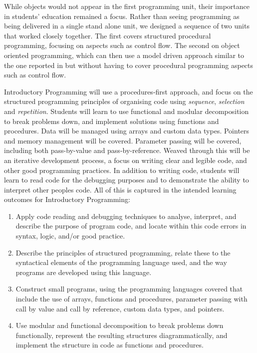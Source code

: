 While objects would not appear in the first programming unit, their importance in students' education remained a focus. Rather than seeing programming as being delivered in a single stand alone unit, we designed a sequence of two units that worked closely together. The first covers structured procedural programming, focusing on aspects such as control flow. The second on object oriented programming, which can then use a model driven approach similar to the one reported in \citet{Bennedsen:2004} but without having to cover procedural programming aspects such as control flow.

Introductory Programming will use a procedures-first approach, and focus on the structured programming principles of organising code using \emph{sequence}, \emph{selection} and \emph{repetition}. Students will learn to use functional and modular decomposition to break problems down, and implement solutions using functions and procedures. Data will be managed using arrays and custom data types. Pointers and memory management will be covered. Parameter passing will be covered, including both pass-by-value and pass-by-reference. Weaved through this will be an iterative development process, a focus on writing clear and legible code, and other good programming practices. In addition to writing code, students will learn to read code for the debugging purposes and to demonstrate the ability to interpret other peoples code. All of this is captured in the intended learning outcomes for Introductory Programming:
\begin{enumerate}
	\item Apply code reading and debugging techniques to analyse, interpret, and describe the purpose of program code, and locate within this code errors in syntax, logic, and/or good practice.
	\item Describe the principles of structured programming, relate these to the syntactical elements of the programming language used, and the way programs are developed using this language.
	\item Construct small programs, using the programming languages covered that include the use of arrays, functions and procedures, parameter passing with call by value and call by reference, custom data types, and pointers.
	\item Use modular and functional decomposition to break problems down functionally, represent the resulting structures diagrammatically, and implement the structure in code as functions and procedures.
\end{enumerate}

